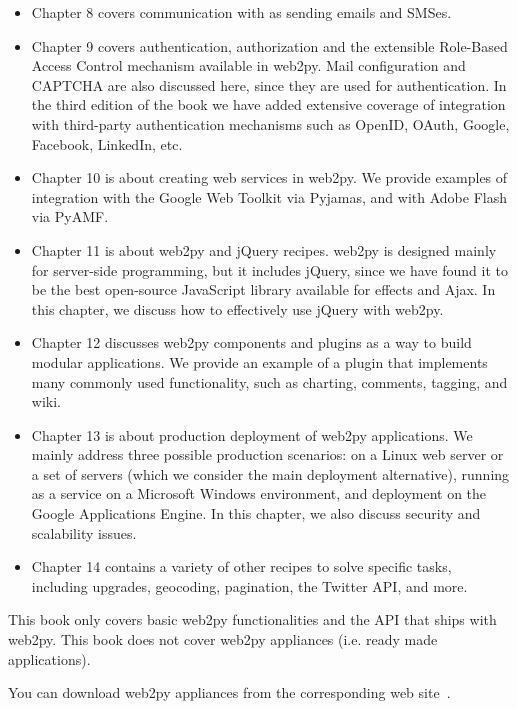 \documentclass[justified,sixbynine,notoc]{tufte-book}
\begin{document}
\begin{fullwidth}
\begin{itemize}
\item Chapter 8 covers communication with as sending emails and SMSes.

\item Chapter 9 covers authentication, authorization and the extensible Role-Based Access Control mechanism available in web2py. Mail configuration and CAPTCHA are also discussed here, since they are used for authentication. In the third edition of the book we have added extensive coverage of integration with third-party authentication mechanisms such as OpenID, OAuth, Google, Facebook, LinkedIn, etc.

\item Chapter 10 is about creating web services in web2py. We provide examples of integration with the Google Web Toolkit via Pyjamas, and with Adobe Flash via PyAMF.

\item Chapter 11 is about web2py and jQuery recipes. web2py is designed mainly for server-side programming, but it includes jQuery, since we have found it to be the best open-source JavaScript library available for effects and Ajax. In this chapter, we discuss how to effectively use jQuery with web2py.

\item Chapter 12 discusses web2py components and plugins as a way to build modular applications. We provide an example of a plugin that implements many commonly used functionality, such as charting, comments, tagging, and wiki.

\item Chapter 13 is about production deployment of web2py applications. We mainly address three possible production scenarios: on a Linux web server or a set of servers (which we consider the main deployment alternative), running as a service on a Microsoft Windows environment, and deployment on the Google Applications Engine. In this chapter, we also discuss security and scalability issues.

\item Chapter 14 contains a variety of other recipes to solve specific tasks, including upgrades, geocoding, pagination, the Twitter API, and more.
\end{itemize}

This book only covers basic web2py functionalities and the API that ships with web2py.
This book does not cover web2py appliances (i.e. ready made applications).

You can download web2py appliances from the corresponding web site~\cite{appliances}.


\end{fullwidth}
\end{document}
